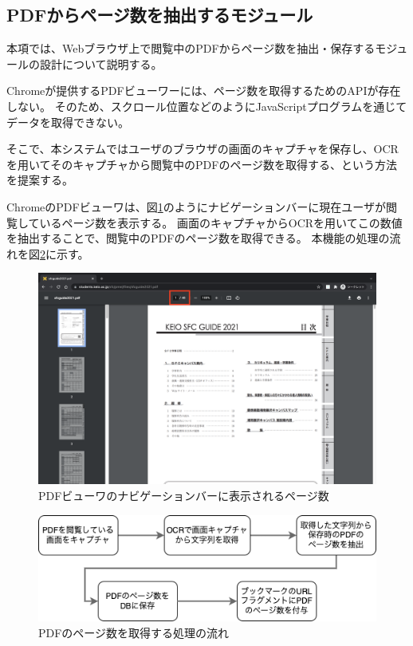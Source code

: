 \subsection{PDFからページ数を抽出するモジュール}
本項では、Webブラウザ上で閲覧中のPDFからページ数を抽出・保存するモジュールの設計について説明する。

Chromeが提供するPDFビューワーには、ページ数を取得するためのAPIが存在しない。
そのため、スクロール位置などのようにJavaScriptプログラムを通じてデータを取得できない。

そこで、本システムではユーザのブラウザの画面のキャプチャを保存し、OCRを用いてそのキャプチャから閲覧中のPDFのページ数を取得する、という方法を提案する。

ChromeのPDFビューワは、図\ref{fig:pdf-viewer-nav-bar-page-num}のようにナビゲーションバーに現在ユーザが閲覧しているページ数を表示する。
画面のキャプチャからOCRを用いてこの数値を抽出することで、閲覧中のPDFのページ数を取得できる。
本機能の処理の流れを図\ref{fig:design-pdf-page-num-extract}に示す。

\begin{figure}[htbp]
  \caption{PDFビューワのナビゲーションバーに表示されるページ数}
  \label{fig:pdf-viewer-nav-bar-page-num}
  \begin{center}
    \includegraphics[bb=0 0 1440 900,width=15cm]{img/040_design/pdf-viewer-nav-bar-page-num.pdf}
  \end{center}
\end{figure}

\begin{figure}[htbp]
  \caption{PDFのページ数を取得する処理の流れ}
  \label{fig:design-pdf-page-num-extract}
  \begin{center}
    \includegraphics[bb=0 0 511 161,width=15cm]{img/040_design/design-pdf-page-num-extract.pdf}
  \end{center}
\end{figure}

